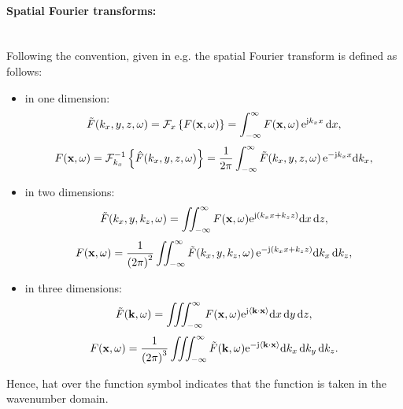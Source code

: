 \paragraph{Spatial Fourier transforms:}\mbox{} \\
Following the convention, given in e.g. \cite{Ahrens2012} the spatial Fourier transform is defined as follows:
\begin{itemize}
\item in one dimension:
\begin{equation}
\label{eq:spatial_fourier_transform_def}
\tilde{F}(k_x,y,z,\omega) = \mathcal{F}_x \left\{ F(\mathbf{x},\omega) \right\} = \int_ {-\infty}^{\infty} F(\mathbf{x},\omega) \, \mathrm{e}^{\mathrm{j} k_x x} \, \mathrm{d} x,
\end{equation}
\begin{equation}
\label{eq:spatial_inverse_fourier_transform_def}
F(\mathbf{x},\omega) = \mathcal{F}_{k_x}^{-1} \left\{ \hat{F}(k_x,y,z,\omega) \right\} = \frac{1}{2\pi} \int_ {-\infty}^{\infty} \tilde{F}(k_x,y,z,\omega) \, \mathrm{e}^{ -\mathrm{j} k_x x} \mathrm{d} k_x,
\end{equation}
\item in two dimensions:
\begin{equation}
\label{eq:spatial_fourier_transform_def_2d}
\tilde{F}(k_x,y,k_z,\omega) = \iint_ {-\infty}^{\infty} F(\mathbf{x},\omega) \mathrm{e}^{\mathrm{j} \left( k_x x + k_z z \right) } \mathrm{d} x \, \mathrm{d} z,
\end{equation}
\begin{equation}
\label{eq:spatial_inverse_fourier_transform_def_2d}
F(\mathbf{x},\omega) = \frac{1}{\left( 2\pi \right)^2} \iint_ {-\infty}^{\infty} \tilde{F}(k_x,y,k_z,\omega) \, \mathrm{e}^{ -\mathrm{j} \left( k_x x + k_z z \right)} \mathrm{d} k_x \, \mathrm{d} k_z,
\end{equation}
\item in three dimensions:
\begin{equation}
\label{eq:spatial_fourier_transform_def_3d}
\tilde{F}(\mathbf{k},\omega)= \iiint_ {-\infty}^{\infty} F(\mathbf{x},\omega) \mathrm{e}^{ \mathrm{j} \left< \mathbf{k} \cdot \mathbf{x} \right>} \mathrm{d} x \,\mathrm{d} y\,\mathrm{d} z,
\end{equation}
\begin{equation}
\label{eq:spatial_inverse_fourier_transform_def_3d}
F(\mathbf{x},\omega) = \frac{1}{\left( 2\pi \right)^3} \iiint_{-\infty}^{\infty} \tilde{F}(\mathbf{k},\omega) \mathrm{e}^{ -\mathrm{j} \left< \mathbf{k} \cdot \mathbf{x} \right>} \mathrm{d} k_x \, \mathrm{d} k_y \, \mathrm{d} k_z.
\end{equation}
\end{itemize}
Hence, hat over the function symbol indicates that the function is taken in the wavenumber domain.
